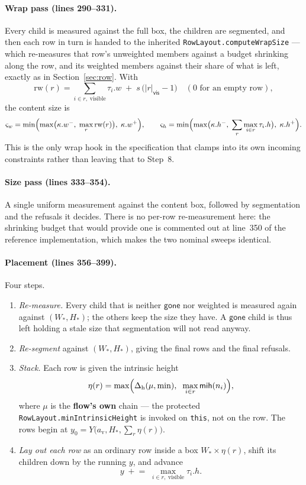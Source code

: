 \documentclass[11pt,a4paper]{article}
\newcommand{\mih}{\mathsf{mih}}
\newcommand{\gone}{\mathsf{gone}}
\newcommand{\vis}{\mathsf{vis}}
\newcommand{\Dh}{\Delta_{\mathrm{h}}}
\newcommand{\jv}[1]{\texttt{#1}}       %
\theoremstyle{definition}
\theoremstyle{plain}
\theoremstyle{remark}
\begin{document}
\paragraph{Wrap pass (lines 290--331).}
Every child is measured against the full box, the children are segmented, and
then each row in turn is handed to the inherited \jv{RowLayout.computeWrapSize}
--- which re-measures that row's unweighted members against a budget shrinking
along the row, and its weighted members against their share of what is left,
exactly as in Section~\ref{sec:row}. With
\[
  \mathrm{rw}(r) = \!\!\sum_{i \in r,\; \text{visible}}\!\! \tau_i.w
    \;+\; s\,\bigl(|r|_{\vis} - 1\bigr)
  \quad (0 \text{ for an empty row}),
\]
the content size is
\[
  \varsigma_w = \min\Bigl(\max\bigl(\kappa.w^-,\; \max_{r} \mathrm{rw}(r)\bigr),\; \kappa.w^+\Bigr),
  \qquad
  \varsigma_h = \min\Bigl(\max\bigl(\kappa.h^-,\; \sum_{r} \max_{i \in r} \tau_i.h\bigr),\; \kappa.h^+\Bigr).
\]
This is the only wrap hook in the specification that clamps into its own incoming
constraints rather than leaving that to Step~8.

\paragraph{Size pass (lines 333--354).}
A single uniform measurement against the content box, followed by segmentation
and the refusals it decides. There is no per-row re-measurement here: the
shrinking budget that would provide one is commented out at line~350 of the
reference implementation, which makes the two nominal sweeps identical.

\paragraph{Placement (lines 356--399).}
Four steps.

\begin{enumerate}[leftmargin=1.6em]
  \item \emph{Re-measure.} Every child that is neither $\gone$ nor weighted is
    measured again against $(W_{\!*}, H_{\!*})$; the others keep the size they
    have. A $\gone$ child is thus left holding a stale size that segmentation
    will not read anyway.
  \item \emph{Re-segment} against $(W_{\!*}, H_{\!*})$, giving the final rows and
    the final refusals.
  \item \emph{Stack.} Each row is given the intrinsic height
    \[
      \eta(r) = \max\Bigl(\Dh(\mu, \min),\;\; \max_{i \in r} \mih(n_i)\Bigr),
    \]
    where $\mu$ is the \textbf{flow's own} chain --- the protected
    \jv{RowLayout.minIntrinsicHeight} is invoked on \jv{this}, not on the row.
    The rows begin at $y_0 = Y\bigl(a_{\mathrm{v}}, H_{\!*}, \sum_r \eta(r)\bigr)$.
  \item \emph{Lay out each row} as an ordinary row inside a box
    $W_{\!*} \times \eta(r)$, shift its children down by the running $y$, and
    advance
    \[
      y \;\mathrel{+}=\; \max_{i \in r,\; \text{visible}} \tau_i.h .
    \]
\end{enumerate}
\end{document}
